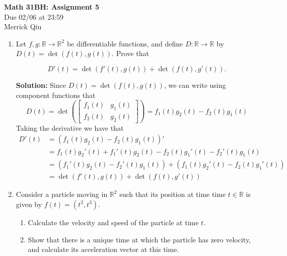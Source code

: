 \documentclass{report}
\newcommand{\solution}{\textbf{Solution: }}
\begin{document}
\begin{center}
	\huge{\bf Math 31BH: Assignment 5} \\
	Due 02/06 at 23:59 \\
	Merrick Qiu
\end{center}

\bigskip

\begin{enumerate}

	\item
	Let $f,g \colon \mathbb{R} \to \mathbb{R}^2$ be differentiable functions, and define
	$D\colon \mathbb{R} \to \mathbb{R}$ by $D(t) = \det(f(t),g(t)).$ Prove that
	
		\begin{equation*}
			D'(t)= \det(f'(t),g(t)) + \det(f(t),g'(t)).
		\end{equation*}				
	
	\solution
	Since $D(t) = \det(f(t), g(t))$, we can write using component functions that 
	\[
		D(t) = \det( 
		\begin{bmatrix}
			f_1(t) & g_1(t) \\
			f_2(t) & g_2(t)
		\end{bmatrix}) =
		f_1(t)g_2(t) - f_2(t)g_1(t)
	\]
	Taking the derivative we have that 
	\begin{align*}
		D'(t) 
		&= (f_1(t)g_2(t) - f_2(t)g_1(t))' \\
		&= f_1(t)g_2'(t) + f_1'(t)g_2(t) - f_2(t)g_1'(t) - f_2'(t)g_1(t) \\
		&= (f_1'(t)g_2(t) - f_2'(t)g_1(t)) + (f_1(t)g_2'(t) - f_2(t)g_1'(t)) \\
		&= \det(f'(t),g(t)) + \det(f(t),g'(t))
	\end{align*}

	\medskip
	\item
	Consider a particle moving in $\mathbb{R}^2$ such that its position at time 
	time $t \in \mathbb{R}$ is given by $f(t)=(t^2,t^3).$ 
	
		\begin{enumerate}
		
			\smallskip
			\item
			Calculate the velocity and speed of the particle at time $t$.
			
			\smallskip
			\item
			Show that there is a unique 
			time at which the particle has zero velocity, and calculate its acceleration vector
			at this time.
			

\end{enumerate}
\end{enumerate}
\end{document}
